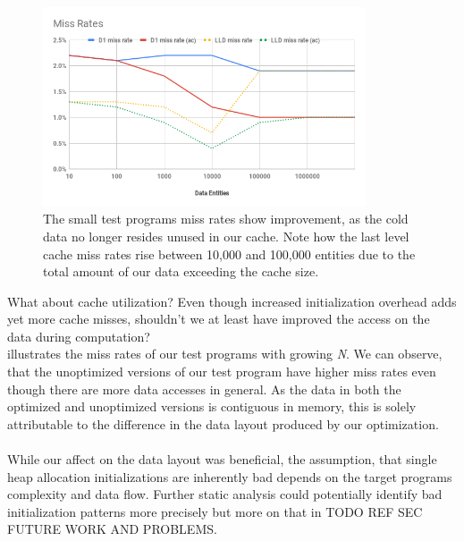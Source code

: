 \begin{figure}[!htbp]
	\centering
	\includegraphics[width=0.85\textwidth, height=0.5\textwidth]{PICs/test_file_miss_rates}
	\caption{The small test programs miss rates show improvement, as the cold data no longer resides unused in our cache. Note how the last level cache miss rates rise between 10,000 and 100,000 entities due to the total amount of our data exceeding the cache size.}
	\label{test_file_miss_rates}
\end{figure}
What about cache utilization? Even though increased initialization overhead adds yet more cache misses, shouldn't we at least have improved the access on the data during computation?\\
 illustrates the miss rates of our test programs with growing \textit{N}. We can observe, that the unoptimized versions of our test program have higher miss rates even though there are more data accesses in general. As the data in both the optimized and unoptimized versions is contiguous in memory, this is solely attributable to the difference in the data layout produced by our optimization.\\\\
While our affect on the data layout was beneficial, the assumption, that single heap allocation initializations are inherently bad depends on the target programs complexity and data flow. Further static analysis could potentially identify bad initialization patterns more precisely but more on that in TODO REF SEC FUTURE WORK AND PROBLEMS.

